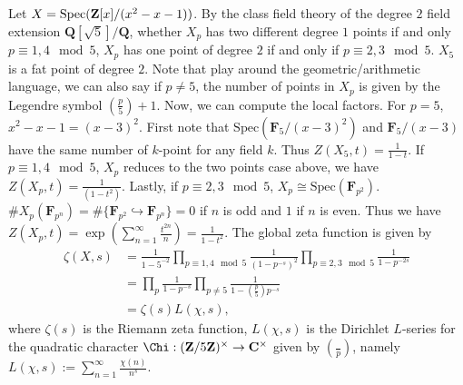 \documentclass[../main.tex]{subfiles}
\begin{document}
\begin{example}
Let $X=\mathrm{Spec}(\mathbf{Z}[x]/(x^{2}-x-1))$. By the class field theory of the degree $2$ field extension $\mathbf{Q}[\sqrt{5}]/\mathbf{Q}$, whether $X_p$ has two different degree $1$ points if and only $p\equiv 1, 4\mod 5$, $X_{p}$ has one point of degree $2$ if and only if $p\equiv 2,3\mod 5$. $X_{5}$ is a fat point of degree $2$. Note that play around the geometric/arithmetic language, we can also say if $p\neq 5$, the number of points in $X_{p}$ is given by the Legendre symbol $(\frac{p}{5})+1$. Now, we can compute the local factors. For $p=5$, $x^2-x-1=(x-3)^{2}$. First note that $\mathrm{Spec}(\mathbf{F}_{5}/(x-3)^{2})$ and $\mathbf{F}_{5}/(x-3)$ have the same number of $k$-point for any field $k$. Thus $Z(X_{5}, t)=\frac{1}{1-t}$. If $p\equiv 1, 4\mod 5$, $X_{p}$ reduces to the two points case above, we have $Z(X_{p},t)=\frac{1}{(1-t^{2})}$. Lastly, if $p\equiv 2,3\mod 5$, $X_{p}\cong \mathrm{Spec}(\mathbf{F}_{p^{2}})$. $\# X_{p}(\mathbf{F}_{p^{n}})=\# \{\mathbf{F}_{p^{2}}\hookrightarrow \mathbf{F}_{p^{n}}\} = 0$ if $n$ is odd and $1$ if $n$ is even. Thus we have $
Z(X_{p},t)=\exp(\sum_{n=1}^{\infty}\frac{t^{2n}}{n})=\frac{1}{1-t^{2}}$. The global zeta function is given by 
$$\begin{aligned}\zeta(X, s)&=\frac{1}{1-5^{-2}}\prod_{p\equiv 1, 4\mod 5}\frac{1}{(1-p^{-s})^{2}}\prod_{p\equiv 2,3\mod 5}\frac{1}{1-p^{-2s}}\\
&=\prod_{p}\frac{1}{1-p^{-s}}\prod_{p\neq 5}\frac{1}{1-(\frac{p}{5})p^{-s}}\\
&=\zeta(s)L(\chi, s),
\end{aligned}$$
where $\zeta(s)$ is the Riemann zeta function, $L(\chi, s)$ is the Dirichlet $L$-series for the quadratic character $\Chi: (\Z/5\Z)^{\times}\rightarrow \C^{\times}$ given by $(\frac{}{p})$, namely $L(\chi, s):=\sum_{n=1}^{\infty}\frac{\chi(n)}{n^{s}}$.
\end{example}
\end{document}
